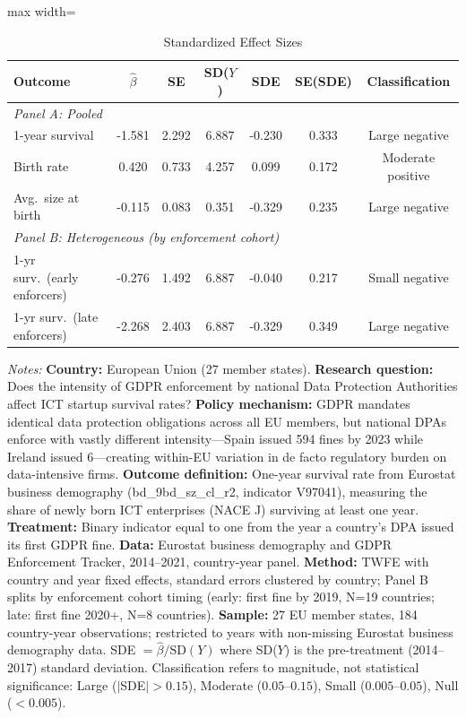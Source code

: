\begin{table}[t]
\centering
\caption{Standardized Effect Sizes}
\label{tab:sde}
\begin{adjustbox}{max width=\textwidth}
\begin{tabular}{lcccccc}
\hline\hline
Outcome & $\hat{\beta}$ & SE & SD($Y$) & SDE & SE(SDE) & Classification \\
\hline
\multicolumn{7}{l}{\textit{Panel A: Pooled}} \\
1-year survival & -1.581 & 2.292 & 6.887 & -0.230 & 0.333 & Large negative \\
Birth rate & 0.420 & 0.733 & 4.257 & 0.099 & 0.172 & Moderate positive \\
Avg.\ size at birth & -0.115 & 0.083 & 0.351 & -0.329 & 0.235 & Large negative \\
\hline
\multicolumn{7}{l}{\textit{Panel B: Heterogeneous (by enforcement cohort)}} \\
1-yr surv.\ (early enforcers) & -0.276 & 1.492 & 6.887 & -0.040 & 0.217 & Small negative \\
1-yr surv.\ (late enforcers) & -2.268 & 2.403 & 6.887 & -0.329 & 0.349 & Large negative \\
\hline\hline
\end{tabular}
\end{adjustbox}
\par\vspace{0.3em}\begin{flushleft}\small
\textit{Notes:} \textbf{Country:} European Union (27 member states). \textbf{Research question:} Does the intensity of GDPR enforcement by national Data Protection Authorities affect ICT startup survival rates? \textbf{Policy mechanism:} GDPR mandates identical data protection obligations across all EU members, but national DPAs enforce with vastly different intensity---Spain issued 594 fines by 2023 while Ireland issued 6---creating within-EU variation in de facto regulatory burden on data-intensive firms. \textbf{Outcome definition:} One-year survival rate from Eurostat business demography (bd\_9bd\_sz\_cl\_r2, indicator V97041), measuring the share of newly born ICT enterprises (NACE J) surviving at least one year. \textbf{Treatment:} Binary indicator equal to one from the year a country's DPA issued its first GDPR fine. \textbf{Data:} Eurostat business demography and GDPR Enforcement Tracker, 2014--2021, country-year panel. \textbf{Method:} TWFE with country and year fixed effects, standard errors clustered by country; Panel B splits by enforcement cohort timing (early: first fine by 2019, N=19 countries; late: first fine 2020+, N=8 countries). \textbf{Sample:} 27 EU member states, 184 country-year observations; restricted to years with non-missing Eurostat business demography data. SDE $= \hat{\beta} / \text{SD}(Y)$ where SD($Y$) is the pre-treatment (2014--2017) standard deviation. Classification refers to magnitude, not statistical significance: Large ($|$SDE$| > 0.15$), Moderate ($0.05$--$0.15$), Small ($0.005$--$0.05$), Null ($< 0.005$).
\end{flushleft}
\end{table}

